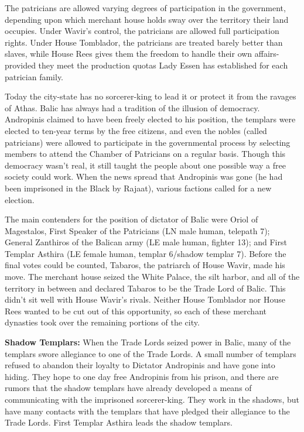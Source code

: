 {	The patricians are allowed varying degrees of participation in the government, depending upon which merchant house holds sway over the territory their land occupies. Under Wavir's control, the patricians are allowed full participation rights. Under House Tomblador, the patricians are treated barely better than slaves, while House Rees gives them the freedom to handle their own affairs-provided they meet the production quotas Lady Essen has established for each patrician family.
}
{
	Today the city-state has no sorcerer-king to lead it or protect it from the ravages of Athas. Balic has always had a tradition of the illusion of democracy. Andropinis claimed to have been freely elected to his position, the templars were elected to ten-year terms by the free citizens, and even the nobles (called patricians) were allowed to participate in the governmental process by selecting members to attend the Chamber of Patricians on a regular basis. Though this democracy wasn't real, it still taught the people about one possible way a free society could work. When the news spread that Andropinis was gone (he had been imprisoned in the Black by Rajaat), various factions called for a new election.

	The main contenders for the position of dictator of Balic were Oriol of Magestalos, First Speaker of the Patricians (LN male human, telepath 7); General Zanthiros of the Balican army (LE male human, fighter 13); and First Templar Asthira (LE female human, templar 6/shadow templar 7). Before the final votes could be counted, Tabaros, the patriarch of House Wavir, made his move. The merchant house seized the White Palace, the silt harbor, and all of the territory in between and declared Tabaros to be the Trade Lord of Balic. This didn't sit well with House Wavir's rivals. Neither House Tomblador nor House Rees wanted to be cut out of this opportunity, so each of these merchant dynasties took over the remaining portions of the city.

	\textbf{Shadow Templars:} When the Trade Lords seized power in Balic, many of the templars swore allegiance to one of the Trade Lords. A small number of templars refused to abandon their loyalty to Dictator Andropinis and have gone into hiding. They hope to one day free Andropinis from his prison, and there are rumors that the shadow templars have already developed a means of communicating with the imprisoned sorcerer-king. They work in the shadows, but have many contacts with the templars that have pledged their allegiance to the Trade Lords. First Templar Asthira leads the shadow templars.

}
